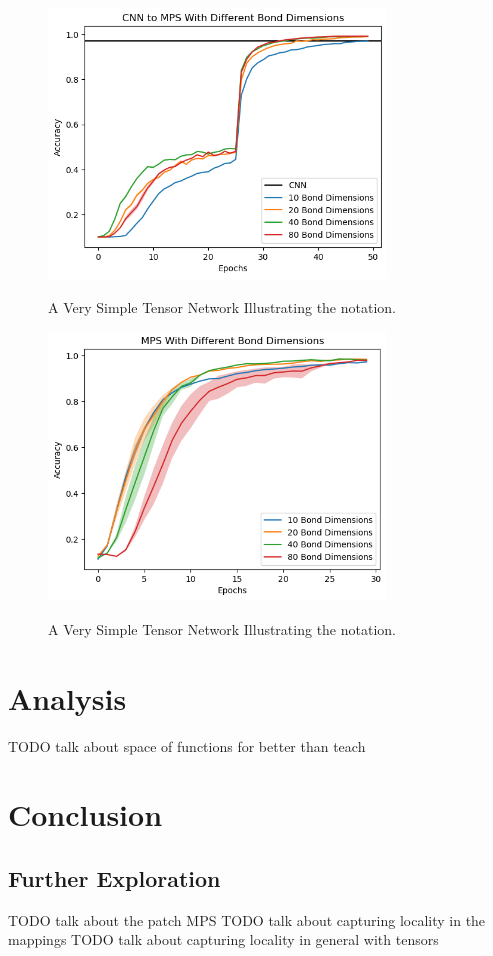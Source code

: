 \documentclass{article}
\theoremstyle{definition}
\theoremstyle{definition}
\begin{document}
\begin{figure}[hbt!]
    \centering
    \caption{A Very Simple Tensor Network Illustrating the notation.}
    \includegraphics[width=0.8\textwidth]{images/2023-04-20-12-40-45.png}
    \label{t}
\end{figure}

\begin{figure}[hbt!]
    \centering
    \caption{A Very Simple Tensor Network Illustrating the notation.}
    \includegraphics[width=0.8\textwidth]{images/2023-04-20-12-42-21.png}
    \label{fig:tensor_net}
\end{figure}

\section{Analysis}

TODO talk about space of functions for better than teach

\section{Conclusion}



\subsection{Further Exploration}
TODO talk about the patch MPS
TODO talk about capturing locality in the mappings
TODO talk about capturing locality in general with tensors

\printbibliography
\end{document}
